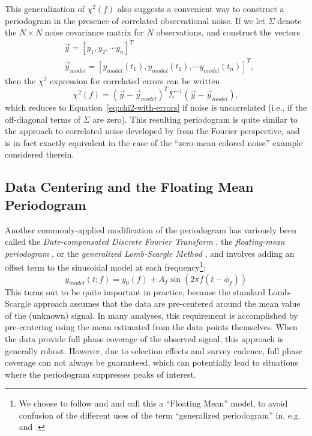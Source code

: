 \documentclass[preprint]{aastex}
\newcommand{\Eq}[1]{Equation~\ref{eq:#1}}
\newcommand{\eq}[1]{\Eq{#1}}
\newcommand{\eqlabel}[1]{\label{eq:#1}}
\newcommand{\sectlabel}[1]{\label{sect:#1}}
\begin{document}
This generalization of $\chi^2(f)$ also suggests a convenient way to
construct a periodogram in the presence of correlated observational noise.
If we let $\Sigma$ denote the  $N\times N$ noise
covariance matrix for $N$ observations, and construct the
vectors
\begin{eqnarray}
  &\vec{y} = [y_1, y_2,\cdots y_n]^T \nonumber\\
  &\vec{y}_{model} = [y_{model}(t_1),y_{model}(t_1),\cdots y_{model}(t_n)]^T,
\end{eqnarray}
then the $\chi^2$ expression for correlated errors can be written
\begin{equation}
  \chi^2(f) = (\vec{y}-\vec{y}_{model})^T\Sigma^{-1}(\vec{y}-\vec{y}_{model}),
  \eqlabel{chi2-with-correlated-errors}
\end{equation}
which reduces to \eq{chi2-with-errors} if noise is uncorrelated (i.e., if the
off-diagonal terms of $\Sigma$ are zero).
This resulting periodogram is quite similar to the approach to correlated
noise developed by \citet{Vio2010} from the Fourier perspective,
and is in fact exactly equivalent in the case of the
``zero-mean colored noise'' example considered therein.

\subsection{Data Centering and the Floating Mean Periodogram}
\sectlabel{floating-mean}

Another commonly-applied modification of the periodogram has variously been
called the
{\it Date-compensated Discrete Fourier Transform} \citep{Ferraz-Mello81},
the {\it floating-mean periodogram} \citep{Cumming99,VanderPlas2015},
or the {\it generalized Lomb-Scargle Method} \citep{Zechmeister09},
and involves adding an offset term to the sinusoidal model at each
frequency\footnote{We choose to follow \citet{Cumming99} and
  \citet{VanderPlas2015} and call this a ``Floating Mean'' model,
  to avoid confusion of the different uses of the term
  ``generalized periodogram'' in, {e.g.} \citet{Bretthorst2001} and
  \citet{Zechmeister09}.
}:
\begin{equation}
  y_{model}(t;f) = y_0(f) + A_f \sin(2 \pi f (t - \phi_f))
  \eqlabel{floating-mean-model}
\end{equation}
This turns out to be quite important in practice, because the standard
Lomb-Scargle approach assumes that the
data are pre-centered around the mean value of the (unknown) signal.
In many analyses, this requirement is accomplished by pre-centering using
the mean estimated from the data points themselves.
When the data provide full phase coverage of the observed signal,
this approach is generally robust.
However, due to selection effects and survey cadence, full phase
coverage can not always be guaranteed, which can potentially lead to situations
where the periodogram suppresses peaks of interest.
\end{document}
